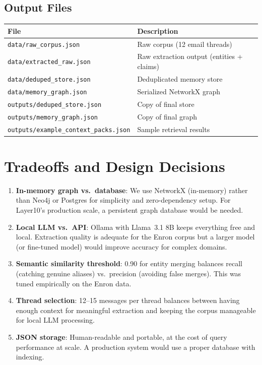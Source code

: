 \documentclass[11pt,a4paper]{article}
\begin{document}
\subsection{Output Files}
\begin{center}
\begin{tabular}{ll}
\toprule
\textbf{File} & \textbf{Description} \\
\midrule
\texttt{data/raw\_corpus.json} & Raw corpus (12 email threads) \\
\texttt{data/extracted\_raw.json} & Raw extraction output (entities + claims) \\
\texttt{data/deduped\_store.json} & Deduplicated memory store \\
\texttt{data/memory\_graph.json} & Serialized NetworkX graph \\
\texttt{outputs/deduped\_store.json} & Copy of final store \\
\texttt{outputs/memory\_graph.json} & Copy of final graph \\
\texttt{outputs/example\_context\_packs.json} & Sample retrieval results \\
\bottomrule
\end{tabular}
\end{center}

\section{Tradeoffs and Design Decisions}

\begin{enumerate}
    \item \textbf{In-memory graph vs.\ database}: We use NetworkX (in-memory) rather than Neo4j or Postgres for simplicity and zero-dependency setup. For Layer10's production scale, a persistent graph database would be needed.
    
    \item \textbf{Local LLM vs.\ API}: Ollama with Llama~3.1 8B keeps everything free and local. Extraction quality is adequate for the Enron corpus but a larger model (or fine-tuned model) would improve accuracy for complex domains.
    
    \item \textbf{Semantic similarity threshold}: 0.90 for entity merging balances recall (catching genuine aliases) vs.\ precision (avoiding false merges). This was tuned empirically on the Enron data.
    
    \item \textbf{Thread selection}: 12--15 messages per thread balances between having enough context for meaningful extraction and keeping the corpus manageable for local LLM processing.
    
    \item \textbf{JSON storage}: Human-readable and portable, at the cost of query performance at scale. A production system would use a proper database with indexing.
\end{enumerate}
\end{document}
